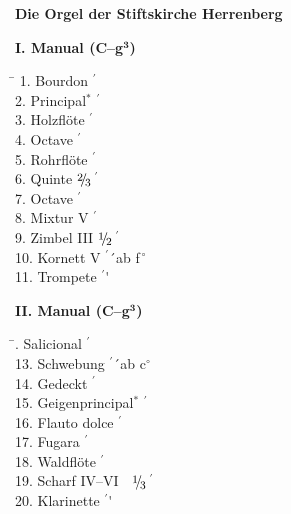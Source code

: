 \documentclass[a4paper,12pt,parskip=half]{scrartcl}
\newcommand{\p}{\phantom{1}}
\newcommand{\Fuss}{$^\prime$}
\newcommand{\bruch}[2]{$\raisebox{2pt}{\footnotesize#1}\hspace{-2pt}/\hspace{-1.5pt}\raisebox{-2pt}{\footnotesize#2}$}
\newcommand{\eh}{\bruch{1}{2}$\,$}
\newcommand{\ed}{\bruch{1}{3}$\,$}
\newcommand{\zd}{\bruch{2}{3}$\,$}
\begin{document}
{\LARGE\bfseries Die Orgel der Stiftskirche Herrenberg}

\vfill

\begin{minipage}[t]{.55\textwidth}
{\bfseries I. Manual (C--g$^{\mathbf3}$)}
\begin{tabbing}
\hspace{5cm}\= \kill
\mbox{}\p1. Bourdon \Fuss\' \\
\p2. Principal$^*$ \Fuss\' \\
\p3. Holzflöte \Fuss\' \\
\p4. Octave \Fuss\' \\
\p5. Rohrflöte \Fuss\' \\
\p6. Quinte  \zd\Fuss\' \\
\p7. Octave \Fuss\' \\
\p8. Mixtur V \Fuss\' \\
\p9. Zimbel III \>\eh\Fuss\' \\
10. Kornett V \Fuss\'\ ab f$^{\,\circ}$ \\
11. Trompete \Fuss\'
\end{tabbing}

{\bfseries II. Manual (C--g$^{\mathbf3}$)}
\begin{tabbing}
\hspace{5cm}\= . Salicional \Fuss\' \\
13. Schwebung \Fuss\'\ ab c$^\circ$ \\
14. Gedeckt \Fuss\' \\
15. Geigenprincipal$^*$ \Fuss\' \\
16. Flauto dolce \Fuss\' \\
17. Fugara \Fuss\' \\
18. Waldflöte \Fuss\' \\
19. Scharf IV--VI $\;$  \ed\Fuss\' \\
20. Klarinette \Fuss\'
\end{tabbing}
\end{minipage}
\end{document}
